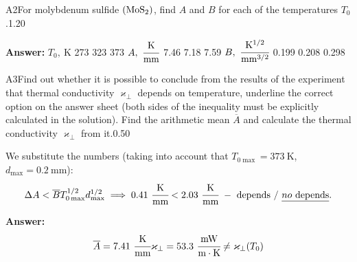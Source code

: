 \documentclass[11pt,a4paper]{article}
\begin{document}
\begin{solcard}{A2}{For molybdenum sulfide $\rm(MoS_2)$, find $A$ and $B$ for each of the temperatures $T_0$.}{1.20}
\par\smallskip\noindent\textbf{Answer:} $T_0,~\mathrm{K}$ 273 323 373 $A,~\cfrac{\mathrm{K}}{\mathrm{mm}}$ 7.46 7.18 7.59 $B,~\cfrac{\mathrm{K}^{1/2}}{\mathrm{mm}^{3/2}}$ 0.199 0.208 0.298
\end{solcard}

\begin{solcard}{A3}{Find out whether it is possible to conclude from the results of the experiment that thermal conductivity $\varkappa_\perp$ depends on temperature, underline the correct option on the answer sheet (both sides of the inequality must be explicitly calculated in the solution). Find the arithmetic mean $\overline A$ and calculate the thermal conductivity $\varkappa_\perp$ from it.}{0.50}

We substitute the numbers (taking into account that $T_{0\max}=373~\mathrm{K}$, $d_{\max}=0.2~\mathrm{mm}$): \[\Delta A < \overline BT_{0\max}^{1/2}d_{\max}^{1/2}\implies0.41~\cfrac{\mathrm{K}}{\mathrm{mm}} < 2.03~\cfrac{\mathrm{K}}{\mathrm{mm}}~-~\text{depends}~/~\underline{no~\text{depends}}.\]

\par\smallskip\noindent\textbf{Answer:} \[\overline{A}=7.41~\cfrac{\mathrm{K}}{\mathrm{mm}}\\\ \\\varkappa_\perp=53.3~\cfrac{\mathrm{mW}}{\text{m}\cdot\text{K}}\ne\varkappa_\perp(T_0)\]
\end{solcard}
\end{document}

